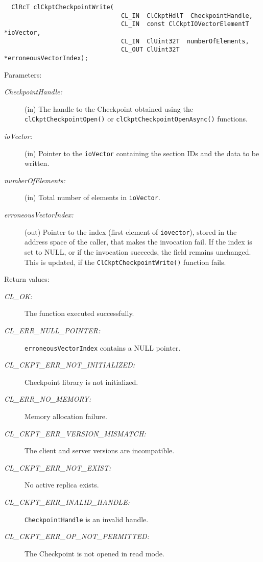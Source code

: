 \begin{flushleft}
\begin{Desc}
\footnotesize\begin{verbatim}  ClRcT clCkptCheckpointWrite(
                     			CL_IN  ClCkptHdlT  CheckpointHandle,
                     			CL_IN  const ClCkptIOVectorElementT   *ioVector,
                     			CL_IN  ClUint32T  numberOfElements,
                     			CL_OUT ClUint32T  *erroneousVectorIndex);
\end{verbatim}
\normalsize
\end{Desc}
\begin{Desc}
\item[Parameters:]
\begin{description}
\item[{\em Checkpoint\-Handle:}](in) The handle to the Checkpoint obtained using the 
 {\tt{clCkptCheckpointOpen()}} or {\tt{clCkptCheckpointOpenAsync()}} functions.
 \item[{\em io\-Vector:}](in) Pointer to the {\tt{ioVector}} containing 
the section IDs and the data to be written. 
\item[{\em number\-Of\-Elements:}](in) Total number of elements in {\tt{io\-Vector}}. 
\item[{\em erroneous\-Vector\-Index:}](out) Pointer to the index (first element of {\tt{iovector}}), stored in the address space of the caller, 
that makes the invocation fail. If the index is set to NULL, or if the invocation succeeds, the field remains unchanged. This is updated, if the 
{\tt{ClCkptCheckpointWrite()}} function fails.\end{description}
\end{Desc}
\begin{Desc}
\item[Return values:]
\begin{description}
\item[{\em CL\_\-OK:}]The function executed successfully. 
\item[{\em CL\_\-ERR\_\-NULL\_\-POINTER:}]{\tt{erroneousVectorIndex}} contains a NULL pointer. 
\item[{\em CL\_\-CKPT\_\-ERR\_\-NOT\_\-INITIALIZED:}]Checkpoint library is not initialized. 
\item[{\em CL\_\-ERR\_\-NO\_\-MEMORY:}]Memory allocation failure.
\item[{\em CL\_\-CKPT\_\-ERR\_\-VERSION\_\-MISMATCH:}]The client and server versions are incompatible.
\item[{\em CL\_\-CKPT\_\-ERR\_\-NOT\_\-EXIST:}] No active replica exists.
\item[{\em CL\_\-CKPT\_\-ERR\_\-INALID\_\-HANDLE:}]{\tt{CheckpointHandle}} is an invalid handle.
\item[{\em CL\_\-CKPT\_\-ERR\_\-OP\_\-NOT\_\-PERMITTED:}] The Checkpoint is not opened in read mode.


\end{description}
\end{Desc}
\end{flushleft}
